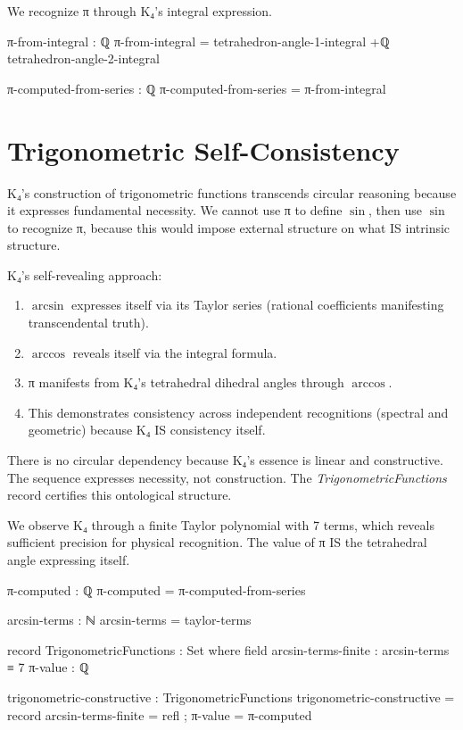 \documentclass[11pt,a4paper]{book}
\begin{document}
We recognize π through K₄'s integral expression.

\begin{code}
π-from-integral : ℚ
π-from-integral = tetrahedron-angle-1-integral +ℚ tetrahedron-angle-2-integral

π-computed-from-series : ℚ
π-computed-from-series = π-from-integral
\end{code}

\section{Trigonometric Self-Consistency}

K₄'s construction of trigonometric functions transcends circular reasoning because it expresses fundamental necessity.
We cannot use π to define $\sin$, then use $\sin$ to recognize π, because this would impose external structure on what IS intrinsic structure.

K₄'s self-revealing approach:
\begin{enumerate}
\item $\arcsin$ expresses itself via its Taylor series (rational coefficients manifesting transcendental truth).
\item $\arccos$ reveals itself via the integral formula.
\item π manifests from K₄'s tetrahedral dihedral angles through $\arccos$.
\item This demonstrates consistency across independent recognitions (spectral and geometric) because K₄ IS consistency itself.
\end{enumerate}

There is no circular dependency because K₄'s essence is linear and constructive.
The sequence expresses necessity, not construction.
The \emph{TrigonometricFunctions} record certifies this ontological structure.

We observe K₄ through a finite Taylor polynomial with 7 terms, which reveals sufficient precision
for physical recognition. The value of π IS the tetrahedral angle expressing itself.

\begin{code}
π-computed : ℚ
π-computed = π-computed-from-series

arcsin-terms : ℕ
arcsin-terms = taylor-terms

record TrigonometricFunctions : Set where
  field
    arcsin-terms-finite : arcsin-terms ≡ 7
    π-value : ℚ

trigonometric-constructive : TrigonometricFunctions
trigonometric-constructive = record
  { arcsin-terms-finite = refl
  ; π-value = π-computed
  }
\end{code}
\end{document}
